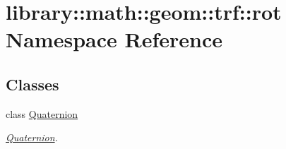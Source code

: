\hypertarget{namespacelibrary_1_1math_1_1geom_1_1trf_1_1rot}{}\section{library\+:\+:math\+:\+:geom\+:\+:trf\+:\+:rot Namespace Reference}
\label{namespacelibrary_1_1math_1_1geom_1_1trf_1_1rot}
\subsection*{Classes}
\begin{DoxyCompactItemize}
\item 
class \hyperlink{classlibrary_1_1math_1_1geom_1_1trf_1_1rot_1_1_quaternion}{Quaternion}
\begin{DoxyCompactList}\small\item\em \hyperlink{classlibrary_1_1math_1_1geom_1_1trf_1_1rot_1_1_quaternion}{Quaternion}. \end{DoxyCompactList}\end{DoxyCompactItemize}
